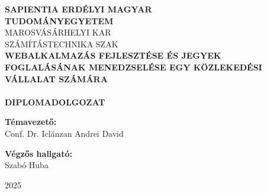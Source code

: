 \begin{titlepage}
    \centering
    \vspace*{2cm}

    {\Large \textbf{SAPIENTIA ERDÉLYI MAGYAR}}\\[0.2cm]
    {\Large \textbf{TUDOMÁNYEGYETEM}}\\[0.5cm]
    {\large MAROSVÁSÁRHELYI KAR}\\[0.2cm]
    {\large SZÁMÍTÁSTECHNIKA SZAK}\\[3cm]

    {\LARGE \textbf{WEBALKALMAZÁS FEJLESZTÉSE ÉS JEGYEK FOGLALÁSÁNAK MENEDZSELÉSE EGY KÖZLEKEDÉSI VÁLLALAT SZÁMÁRA}}\\[0.5cm] 
    {\Large \textbf{}}\\[0.5cm]
    {\LARGE \textbf{ DIPLOMADOLGOZAT}}\\[4cm]

    \noindent
    \begin{minipage}[t]{0.48\textwidth}
        \raggedright
        \textbf{Témavezető:}\\[1em]
        Conf. Dr. Iclănzan Andrei David
    \end{minipage}
    \hfill
    \begin{minipage}[t]{0.48\textwidth}
        \raggedleft
        \textbf{Végzős hallgató:}\\[1em]
        Szabó Huba
    \end{minipage}


    \vfill

    {\large  2025}

\end{titlepage}
